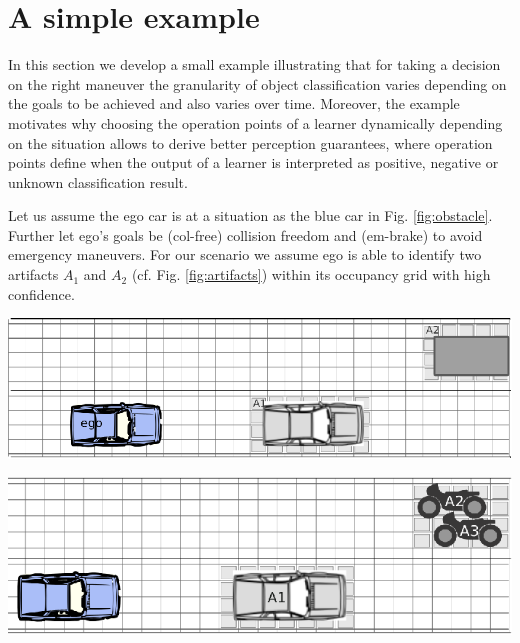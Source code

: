 \section{A simple example}\label{sec:example}
In this section we develop a small  example illustrating that for taking a decision on the right maneuver the granularity of object classification varies depending on the goals to be achieved and also varies over time. Moreover, the example motivates why choosing the operation points of a learner dynamically depending on the situation allows to derive better perception guarantees, where operation points define when the output of a learner is interpreted as positive, negative or unknown classification result. 

Let us assume the ego car is at a situation as the blue car in Fig. \ref{fig:obstacle}.  
Further let ego's goals be (col-free) collision freedom and (em-brake) to avoid emergency maneuvers.
%
For our scenario we assume %
ego is able to identify two artifacts $A_1$ and $A_2$ (cf. Fig. \ref{fig:artifacts}) within its occupancy grid with high confidence. \\[2mm] 
%
\begin{minipage}{\textwidth}
	\begin{minipage}{0.45\textwidth}
	\centering
	\includegraphics[width=.8\textwidth]{ego+artifacts.eps}
	\label{fig:artifacts}
\end{minipage}\hfill	
\begin{minipage}{0.45\textwidth}
	\centering
	\includegraphics[width=.8\textwidth]{ego+motorbike.eps}
	\label{fig:mbike}
\end{minipage}
\vspace*{1mm}
\end{minipage}


